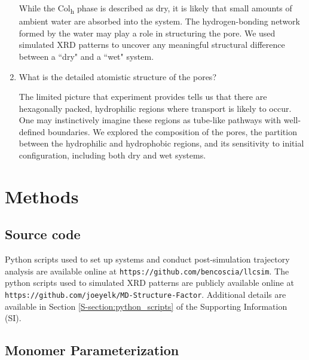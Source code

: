 \documentclass[journal=jpcbfk,manuscript=article]{achemso}
\begin{document}
\begin{enumerate}
	While the Col\textsubscript{h} phase is described as dry, it is likely
	that small amounts of ambient water are absorbed into the system. The
	hydrogen-bonding network formed by the water may play a role in structuring the
	pore. We used simulated XRD patterns to uncover any meaningful structural
	difference between a ``dry" and a ``wet" system.

	\item What is the detailed atomistic structure of the pores?\label{point:composition}

	The limited picture that experiment provides tells us that there are hexagonally packed, 
	hydrophilic regions where transport is likely to occur. One may instinctively imagine these 
	regions as tube-like pathways with well-defined boundaries. We explored the composition
	of the pores, the partition between the hydrophilic and hydrophobic regions, and its 
	sensitivity to initial configuration, including both dry and wet systems. 

  \end{enumerate}

  \section{Methods}
 
  \subsection{Source code}

  Python scripts used to set up systems and conduct post-simulation trajectory analysis are
  available online at \texttt{https://github.com/bencoscia/llcsim}. The python scripts used
  to simulated XRD patterns are publicly available online at \\
  \texttt{https://github.com/joeyelk/MD-Structure-Factor}. Additional details are available in 
  Section \ref{S-section:python_scripts} of the Supporting Information (SI).
  
  \subsection{Monomer Parameterization}\label{method:parameterization}
\end{document}
